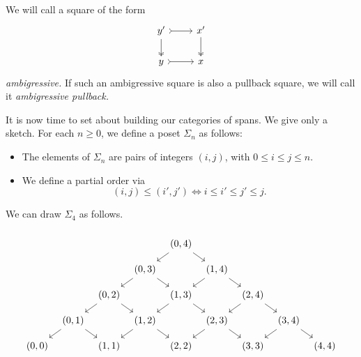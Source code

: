 \documentclass[main.tex]{subfiles}
\begin{document}
We will call a square of the form
\begin{equation*}
  \begin{tikzcd}
    y'
    \arrow[r, rightarrowtail]
    \arrow[d, two heads]
    & x'
    \arrow[d, two heads]
    \\
    y
    \arrow[r, rightarrowtail]
    & x
  \end{tikzcd}
\end{equation*}
\emph{ambigressive.} If such an ambigressive square is also a pullback square, we will call it \emph{ambigressive pullback.}

It is now time to set about building our categories of spans. We give only a sketch. For each $n \geq 0$, we define a poset $\Sigma_{n}$ as follows:
\begin{itemize}
  \item The elements of $\Sigma_{n}$ are pairs of integers $(i, j)$, with $0 \leq i \leq j \leq n$.

  \item We define a partial order via 
    \begin{equation*}
      (i, j) \leq (i', j') \iff i \leq i' \leq j' \leq j.
    \end{equation*}
\end{itemize}

\begin{example}
  We can draw $\Sigma_{4}$ as follows.
  \begin{equation*}
    \begin{tikzcd}[column sep=tiny, row sep=small]
      \\
      &&&& {(0, 4)}
      \arrow[dl]
      \arrow[dr]
      \\
      &&& {(0, 3)}
      \arrow[dl]
      \arrow[dr]
      && {(1, 4)}
      \arrow[dl]
      \arrow[dr]
      \\
      && {(0, 2)}
      \arrow[dl]
      \arrow[dr]
      && {(1, 3)}
      \arrow[dl]
      \arrow[dr]
      && {(2, 4)}
      \arrow[dl]
      \arrow[dr]
      \\
      & {(0, 1)}
      \arrow[dl]
      \arrow[dr]
      && {(1, 2)}
      \arrow[dl]
      \arrow[dr]
      && {(2, 3)}
      \arrow[dl]
      \arrow[dr]
      && {(3, 4)}
      \arrow[dl]
      \arrow[dr]
      \\
      {(0, 0)}
      && {(1, 1)}
      && {(2, 2)}
      && {(3, 3)}
      && {(4, 4)}
    \end{tikzcd}
  \end{equation*}
\end{example}
\end{document}
